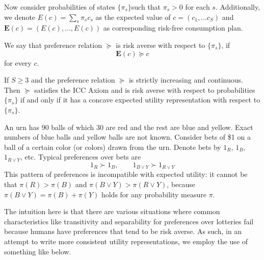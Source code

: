 \documentclass[11pt,english]{article}
\begin{document}
Now consider probabilities of states $\{\pi_s\}$such that $\pi_s > 0$ for each $s$. Additionally, we denote $E(c) = \sum_s \pi_s c_s$ as the expected value of $c = (c_1, \ldots c_S)$ and $\mathbf{E}(c) = (E(c), \ldots, E(c))$ as corresponding risk-free consumption plan.
\begin{definition}
We say that preference relation $\succeq$ is risk averse with respect to $\{\pi_s\}$, if $$\mathbf{E}(c) \succeq c$$ for every $c$.
\end{definition}
\begin{theorem}[Theorem 16.2]
If $S \geq 3$ and the preference relation $\succeq$ is strictly increasing and continuous. Then $\succeq$ satisfies the ICC Axiom and is risk averse with respect to probabilities $\{\pi_s\}$ if and only if it has a concave expected utility representation with respect to $\{\pi_s\}$.
\end{theorem}
\begin{definition}
An urn has 90 balls of which 30 are red and the rest are blue and yellow.
Exact numbers of blue balls and yellow balls are not known. Consider bets of
\$1 on a ball of a certain color (or colors) drawn from the urn. Denote bets
by $1_R$, $1_B$, $1_{R \vee Y}$, etc. Typical preferences over bets are
\[
    1_R \succ 1_B, \qquad 1_{B \vee Y} \succ 1_{R \vee Y}
\]
This pattern of preferences is incompatible with expected utility: it cannot be
that $\pi(R) > \pi(B)$ and $\pi(B \vee Y) > \pi(R \vee Y)$, because
$\pi(B \vee Y) = \pi(B) + \pi(Y)$ holds for any probability measure $\pi$.
 \end{definition}
The intuition here is that there are various situations where common characteristics like transitivity and separability for preferences over lotteries fail because humans have preferences that tend to be risk averse. As such, in an attempt to write more consistent utility representations, we employ the use of something like below.
\end{document}
